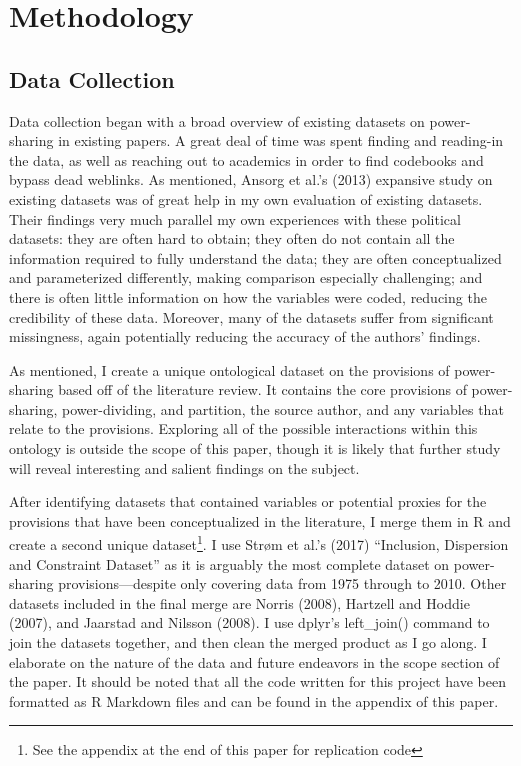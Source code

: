 \documentclass[12pt]{article}
\begin{document}
\section{Methodology}
\subsection{Data Collection}
Data collection began with a broad overview of existing datasets on power-sharing in existing papers. A great deal of time was spent finding and reading-in the data, as well as reaching out to academics in order to find codebooks and bypass dead weblinks. As mentioned, Ansorg et al.’s (2013) expansive study on existing datasets was of great help in my own evaluation of existing datasets. Their findings very much parallel my own experiences with these political datasets: they are often hard to obtain; they often do not contain all the information required to fully understand the data; they are often conceptualized and parameterized differently, making comparison especially challenging; and there is often little information on how the variables were coded, reducing the credibility of these data. Moreover, many of the datasets suffer from significant missingness, again potentially reducing the accuracy of the authors’ findings. 

As mentioned, I create a unique ontological dataset on the provisions of power-sharing based off of the literature review. It contains the core provisions of power-sharing, power-dividing, and partition, the source author, and any variables that relate to the provisions. Exploring all of the possible interactions within this ontology is outside the scope of this paper, though it is likely that further study will reveal interesting and salient findings on the subject. 

After identifying datasets that contained variables or potential proxies for the provisions that have been conceptualized in the literature, I merge them in R and create a second unique dataset\footnote{See the appendix at the end of this paper for replication code}. I use Strøm et al.’s (2017) “Inclusion, Dispersion and Constraint Dataset” as it is arguably the most complete dataset on power-sharing provisions—despite only covering data from 1975 through to 2010. Other datasets included in the final merge are Norris (2008), Hartzell and Hoddie (2007), and Jaarstad and Nilsson (2008). I use dplyr’s left\_join() command to join the datasets together, and then clean the merged product as I go along. I elaborate on the nature of the data and future endeavors in the scope section of the paper. It should be noted that all the code written for this project have been formatted as R Markdown files and can be found in the appendix of this paper. 
\end{document}
